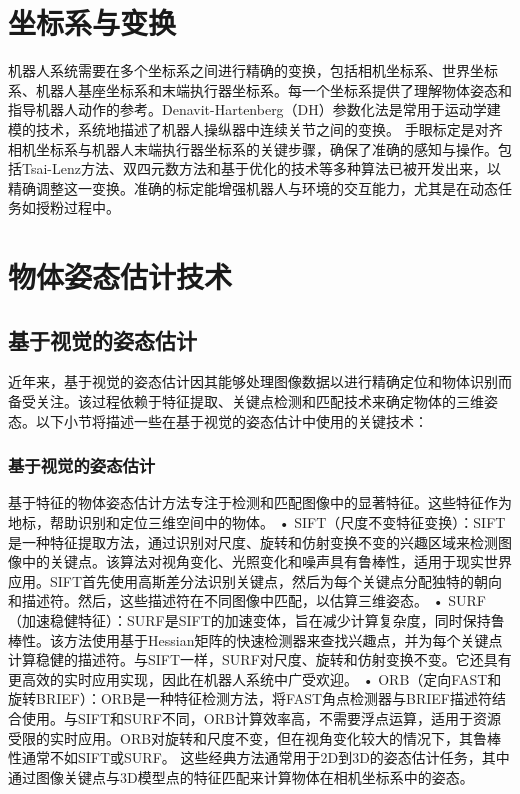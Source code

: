 \section{坐标系与变换}

机器人系统需要在多个坐标系之间进行精确的变换，包括相机坐标系、世界坐标系、机器人基座坐标系和末端执行器坐标系。每一个坐标系提供了理解物体姿态和指导机器人动作的参考。Denavit-Hartenberg（DH）参数化法是常用于运动学建模的技术，系统地描述了机器人操纵器中连续关节之间的变换。
手眼标定是对齐相机坐标系与机器人末端执行器坐标系的关键步骤，确保了准确的感知与操作。包括Tsai-Lenz方法、双四元数方法和基于优化的技术等多种算法已被开发出来，以精确调整这一变换。准确的标定能增强机器人与环境的交互能力，尤其是在动态任务如授粉过程中。


\section{物体姿态估计技术}
\subsection{基于视觉的姿态估计}
近年来，基于视觉的姿态估计因其能够处理图像数据以进行精确定位和物体识别而备受关注。该过程依赖于特征提取、关键点检测和匹配技术来确定物体的三维姿态。以下小节将描述一些在基于视觉的姿态估计中使用的关键技术：
\subsubsection{基于视觉的姿态估计}
基于特征的物体姿态估计方法专注于检测和匹配图像中的显著特征。这些特征作为地标，帮助识别和定位三维空间中的物体。
•	SIFT（尺度不变特征变换）：SIFT是一种特征提取方法，通过识别对尺度、旋转和仿射变换不变的兴趣区域来检测图像中的关键点。该算法对视角变化、光照变化和噪声具有鲁棒性，适用于现实世界应用。SIFT首先使用高斯差分法识别关键点，然后为每个关键点分配独特的朝向和描述符。然后，这些描述符在不同图像中匹配，以估算三维姿态。
•	SURF（加速稳健特征）：SURF是SIFT的加速变体，旨在减少计算复杂度，同时保持鲁棒性。该方法使用基于Hessian矩阵的快速检测器来查找兴趣点，并为每个关键点计算稳健的描述符。与SIFT一样，SURF对尺度、旋转和仿射变换不变。它还具有更高效的实时应用实现，因此在机器人系统中广受欢迎。
•	ORB（定向FAST和旋转BRIEF）：ORB是一种特征检测方法，将FAST角点检测器与BRIEF描述符结合使用。与SIFT和SURF不同，ORB计算效率高，不需要浮点运算，适用于资源受限的实时应用。ORB对旋转和尺度不变，但在视角变化较大的情况下，其鲁棒性通常不如SIFT或SURF。
这些经典方法通常用于2D到3D的姿态估计任务，其中通过图像关键点与3D模型点的特征匹配来计算物体在相机坐标系中的姿态。
